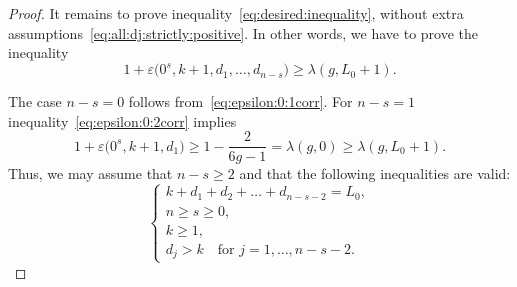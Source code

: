 \documentclass[pdftex]{sigma}
\renewcommand{\epsilon}{\varepsilon}
\theoremstyle{definition}
\begin{document}
\begin{proof}
It remains to prove inequality~\eqref{eq:desired:inequality},
without extra assumptions~\eqref{eq:all:dj:strictly:positive}.
In other words, we have to prove the inequality
\[
1+\epsilon\big(0^s,k+1,d_1,\dots,d_{n-s}\big)\ge \lambda(g,L_0+1) .
\]

The case $n-s=0$ follows from~\eqref{eq:epsilon:0:1corr}. For $n-s=1$ inequality~\eqref{eq:epsilon:0:2corr} implies
\[
1+\epsilon\big(0^s,k+1,d_1\big)\ge 1-\frac{2}{6g-1} =\lambda(g,0) \ge \lambda(g,L_0+1) .
\]
Thus, we may assume that $n-s\ge 2$ and that the following inequalities are valid:
\[
\begin{cases}
k+d_1+d_2+\dots+d_{n-s-2}=L_0 ,
\\ n\ge s\ge 0 ,
\\ k\ge 1 ,
\\ d_j> k\quad\text{for }j=1,\dots,n-s-2 .
\end{cases}
\]


\end{proof}
\end{document}
